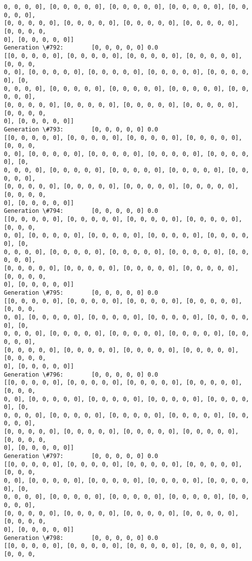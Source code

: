 \documentclass[11pt]{article}
\begin{document}
\begin{Verbatim}[commandchars=\\\{\}]
0, 0, 0, 0], [0, 0, 0, 0, 0], [0, 0, 0, 0, 0], [0, 0, 0, 0, 0], [0, 0, 0, 0, 0],
[0, 0, 0, 0, 0], [0, 0, 0, 0, 0], [0, 0, 0, 0, 0], [0, 0, 0, 0, 0], [0, 0, 0, 0,
0], [0, 0, 0, 0, 0]]
Generation \#792:        [0, 0, 0, 0, 0] 0.0
[[0, 0, 0, 0, 0], [0, 0, 0, 0, 0], [0, 0, 0, 0, 0], [0, 0, 0, 0, 0], [0, 0, 0,
0, 0], [0, 0, 0, 0, 0], [0, 0, 0, 0, 0], [0, 0, 0, 0, 0], [0, 0, 0, 0, 0], [0,
0, 0, 0, 0], [0, 0, 0, 0, 0], [0, 0, 0, 0, 0], [0, 0, 0, 0, 0], [0, 0, 0, 0, 0],
[0, 0, 0, 0, 0], [0, 0, 0, 0, 0], [0, 0, 0, 0, 0], [0, 0, 0, 0, 0], [0, 0, 0, 0,
0], [0, 0, 0, 0, 0]]
Generation \#793:        [0, 0, 0, 0, 0] 0.0
[[0, 0, 0, 0, 0], [0, 0, 0, 0, 0], [0, 0, 0, 0, 0], [0, 0, 0, 0, 0], [0, 0, 0,
0, 0], [0, 0, 0, 0, 0], [0, 0, 0, 0, 0], [0, 0, 0, 0, 0], [0, 0, 0, 0, 0], [0,
0, 0, 0, 0], [0, 0, 0, 0, 0], [0, 0, 0, 0, 0], [0, 0, 0, 0, 0], [0, 0, 0, 0, 0],
[0, 0, 0, 0, 0], [0, 0, 0, 0, 0], [0, 0, 0, 0, 0], [0, 0, 0, 0, 0], [0, 0, 0, 0,
0], [0, 0, 0, 0, 0]]
Generation \#794:        [0, 0, 0, 0, 0] 0.0
[[0, 0, 0, 0, 0], [0, 0, 0, 0, 0], [0, 0, 0, 0, 0], [0, 0, 0, 0, 0], [0, 0, 0,
0, 0], [0, 0, 0, 0, 0], [0, 0, 0, 0, 0], [0, 0, 0, 0, 0], [0, 0, 0, 0, 0], [0,
0, 0, 0, 0], [0, 0, 0, 0, 0], [0, 0, 0, 0, 0], [0, 0, 0, 0, 0], [0, 0, 0, 0, 0],
[0, 0, 0, 0, 0], [0, 0, 0, 0, 0], [0, 0, 0, 0, 0], [0, 0, 0, 0, 0], [0, 0, 0, 0,
0], [0, 0, 0, 0, 0]]
Generation \#795:        [0, 0, 0, 0, 0] 0.0
[[0, 0, 0, 0, 0], [0, 0, 0, 0, 0], [0, 0, 0, 0, 0], [0, 0, 0, 0, 0], [0, 0, 0,
0, 0], [0, 0, 0, 0, 0], [0, 0, 0, 0, 0], [0, 0, 0, 0, 0], [0, 0, 0, 0, 0], [0,
0, 0, 0, 0], [0, 0, 0, 0, 0], [0, 0, 0, 0, 0], [0, 0, 0, 0, 0], [0, 0, 0, 0, 0],
[0, 0, 0, 0, 0], [0, 0, 0, 0, 0], [0, 0, 0, 0, 0], [0, 0, 0, 0, 0], [0, 0, 0, 0,
0], [0, 0, 0, 0, 0]]
Generation \#796:        [0, 0, 0, 0, 0] 0.0
[[0, 0, 0, 0, 0], [0, 0, 0, 0, 0], [0, 0, 0, 0, 0], [0, 0, 0, 0, 0], [0, 0, 0,
0, 0], [0, 0, 0, 0, 0], [0, 0, 0, 0, 0], [0, 0, 0, 0, 0], [0, 0, 0, 0, 0], [0,
0, 0, 0, 0], [0, 0, 0, 0, 0], [0, 0, 0, 0, 0], [0, 0, 0, 0, 0], [0, 0, 0, 0, 0],
[0, 0, 0, 0, 0], [0, 0, 0, 0, 0], [0, 0, 0, 0, 0], [0, 0, 0, 0, 0], [0, 0, 0, 0,
0], [0, 0, 0, 0, 0]]
Generation \#797:        [0, 0, 0, 0, 0] 0.0
[[0, 0, 0, 0, 0], [0, 0, 0, 0, 0], [0, 0, 0, 0, 0], [0, 0, 0, 0, 0], [0, 0, 0,
0, 0], [0, 0, 0, 0, 0], [0, 0, 0, 0, 0], [0, 0, 0, 0, 0], [0, 0, 0, 0, 0], [0,
0, 0, 0, 0], [0, 0, 0, 0, 0], [0, 0, 0, 0, 0], [0, 0, 0, 0, 0], [0, 0, 0, 0, 0],
[0, 0, 0, 0, 0], [0, 0, 0, 0, 0], [0, 0, 0, 0, 0], [0, 0, 0, 0, 0], [0, 0, 0, 0,
0], [0, 0, 0, 0, 0]]
Generation \#798:        [0, 0, 0, 0, 0] 0.0
[[0, 0, 0, 0, 0], [0, 0, 0, 0, 0], [0, 0, 0, 0, 0], [0, 0, 0, 0, 0], [0, 0, 0,

\end{Verbatim}
\end{document}
